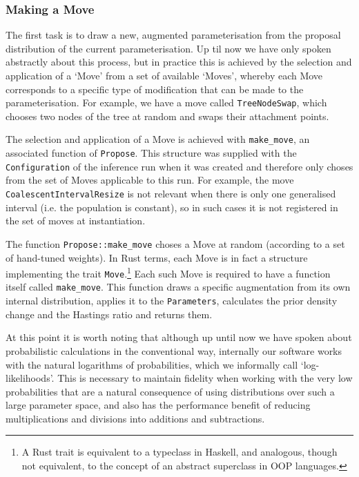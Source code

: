 \documentclass[10pt,journal,compsoc]{IEEEtran}
\begin{document}
\subsubsection{Making a Move}

The first task is to draw a new, augmented parameterisation from the proposal distribution of the current parameterisation. Up til now we have only spoken abstractly about this process, but in practice this is achieved by the selection and application of a `Move' from a set of available `Moves', whereby each Move corresponds to a specific type of modification that can be made to the parameterisation. For example, we have a move called \texttt{TreeNodeSwap}, which chooses two nodes of the tree at random and swaps their attachment points.

The selection and application of a Move is achieved with \texttt{make\_move}, an associated function of \texttt{Propose}. This structure was supplied with the \texttt{Configuration} of the inference run when it was created and therefore only choses from the set of Moves applicable to this run. For example, the move \texttt{CoalescentIntervalResize} is not relevant when there is only one generalised interval (i.e. the population is constant), so in such cases it is not registered in the set of moves at instantiation.

The function \texttt{Propose::make\_move} choses a Move at random (according to a set of hand-tuned weights). In Rust terms, each Move is in fact a structure implementing the trait \texttt{Move}.\footnote{A Rust trait is equivalent to a typeclass in Haskell, and analogous, though not equivalent, to the concept of an abstract superclass in OOP languages.} Each such Move is required to have a function itself called \texttt{make\_move}. This function draws a specific augmentation from its own internal distribution, applies it to the \texttt{Parameters}, calculates the prior density change and the Hastings ratio and returns them.

At this point it is worth noting that although up until now we have spoken about probabilistic calculations in the conventional way, internally our software works with the natural logarithms of probabilities, which we informally call `log-likelihoods'. This is necessary to maintain fidelity when working with the very low probabilities that are a natural consequence of using distributions over such a large parameter space, and also has the performance benefit of reducing multiplications and divisions into additions and subtractions.
\end{document}
